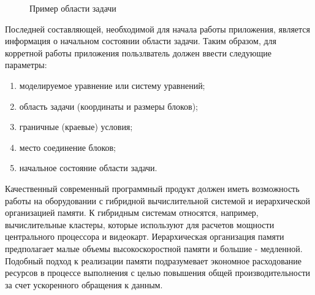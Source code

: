\documentclass[a4paper, 14pt]{extarticle}
\theoremstyle{definition}
\begin{document}
\begin{figure}[h]
	\caption{Пример области задачи}
	\label{ris:2Block_ex}
\end{figure}

\par Последней составляющей, необходимой для начала работы приложения, является информация о начальном состоянии области задачи. Таким образом, для корретной работы приложения пользлватель должен ввести следующие параметры:
\begin{enumerate}
\item моделируемое уравнение или систему уравнений;
\item область задачи (координаты и размеры блоков);
\item граничные (краевые) условия;
\item место соединение блоков;
\item начальное состояние области задачи.
\end{enumerate}

\par Качественный современный программный продукт должен иметь возможность работы на оборудовании с гибридной вычислительной системой и иерархической организацией памяти. К гибридным системам относятся, например, вычислительные кластеры, которые используют для расчетов мощности центрального процессора и видеокарт. Иерархическая организация памяти предполагает малые объемы высокоскоростной памяти и большие - медленной. Подобный подход к реализации памяти подразумевает экономное расходование ресурсов в процессе выполнения с целью повышения общей производительности за счет ускоренного обращения к данным.
\end{document}
